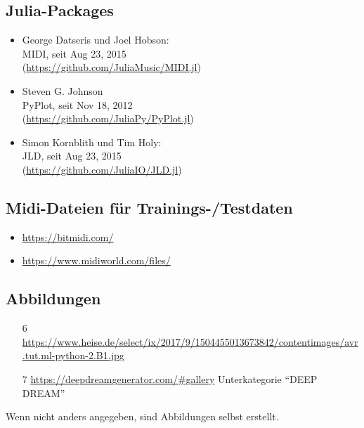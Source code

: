 \documentclass[11pt, a4paper, ngerman]{article}
\begin{document}
\subsection{Julia-Packages}
\begin{itemize}
	\item \label{src:midi}George Datseris und Joel Hobson:\\[0.25ex]
	MIDI, seit Aug 23, 2015\\
	(\href{https://github.com/JuliaMusic/MIDI.jl}{https://github.com/JuliaMusic/MIDI.jl})
	\item \label{src:pyplot} Steven G. Johnson\\[0.25ex]
	PyPlot, seit Nov 18, 2012\\
	(\href{https://github.com/JuliaPy/PyPlot.jl}{https://github.com/JuliaPy/PyPlot.jl}) 
	\item \label{src:jld} Simon Kornblith und Tim Holy:\\[0.25ex]
	JLD, seit Aug 23, 2015\\
	(\href{https://github.com/JuliaIO/JLD.jl}{https://github.com/JuliaIO/JLD.jl}) 
\end{itemize}
	
\subsection{Midi-Dateien für Trainings-/Testdaten}
	\begin{itemize}
		\item \href{https://bitmidi.com/}{https://bitmidi.com/}
		\item \href{https://www.midiworld.com/files/}{https://www.midiworld.com/files/}
	\end{itemize}

\subsection{Abbildungen}
\begin{itemize}
	\item[6] \label{src:num_4} \href{https://www.heise.de/select/ix/2017/9/1504455013673842/contentimages/avr.tut.ml-python-2.B1.jpg}{https://www.heise.de/select/ix/2017/9/1504455013673842/contentimages/avr.tut.ml-python-2.B1.jpg}
	\item[7] \label{src:deep_dream} \href{https://deepdreamgenerator.com/\#gallery}{https://deepdreamgenerator.com/\#gallery} \textrightarrow Unterkategorie \enquote{DEEP DREAM}
\end{itemize}
Wenn nicht anders angegeben, sind Abbildungen selbst erstellt.
\end{document}
